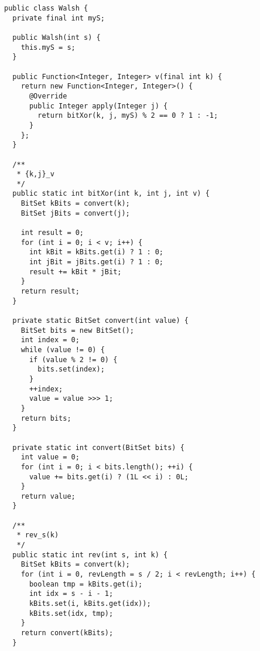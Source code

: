 \begin{lstlisting}[caption={Вычисление дискретных функций Уолша}]
public class Walsh {
  private final int myS;

  public Walsh(int s) {
    this.myS = s;
  }

  public Function<Integer, Integer> v(final int k) {
    return new Function<Integer, Integer>() {
      @Override
      public Integer apply(Integer j) {
        return bitXor(k, j, myS) % 2 == 0 ? 1 : -1;
      }
    };
  }

  /**
   * {k,j}_v
   */
  public static int bitXor(int k, int j, int v) {
    BitSet kBits = convert(k);
    BitSet jBits = convert(j);

    int result = 0;
    for (int i = 0; i < v; i++) {
      int kBit = kBits.get(i) ? 1 : 0;
      int jBit = jBits.get(i) ? 1 : 0;
      result += kBit * jBit;
    }
    return result;
  }

  private static BitSet convert(int value) {
    BitSet bits = new BitSet();
    int index = 0;
    while (value != 0) {
      if (value % 2 != 0) {
        bits.set(index);
      }
      ++index;
      value = value >>> 1;
    }
    return bits;
  }

  private static int convert(BitSet bits) {
    int value = 0;
    for (int i = 0; i < bits.length(); ++i) {
      value += bits.get(i) ? (1L << i) : 0L;
    }
    return value;
  }

  /**
   * rev_s(k)
   */
  public static int rev(int s, int k) {
    BitSet kBits = convert(k);
    for (int i = 0, revLength = s / 2; i < revLength; i++) {
      boolean tmp = kBits.get(i);
      int idx = s - i - 1;
      kBits.set(i, kBits.get(idx));
      kBits.set(idx, tmp);
    }
    return convert(kBits);
  }
\end{lstlisting}